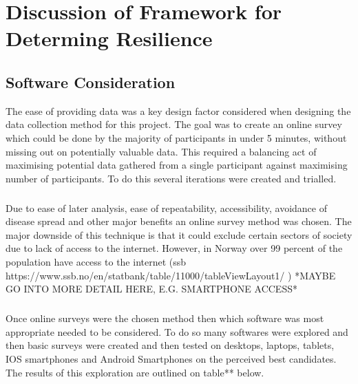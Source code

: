 \chapter{Discussion of Framework for Determing Resilience}

\section{Software Consideration}

The ease of providing data was a key design factor considered when designing the data collection method for this project. The goal was to create an online survey which could be done by the majority of participants in under 5 minutes, without missing out on potentially valuable data. This required a balancing act of maximising potential data gathered from a single participant against maximising number of participants. To do this several iterations were created and trialled.
\paragraph{}
Due to ease of later analysis, ease of repeatability, accessibility,  avoidance of disease spread and other major benefits an online survey method was chosen. The major downside of this technique is that it could exclude certain sectors of society due to lack of access to the internet. However, in Norway over 99 percent of the population have access to the internet (ssb https://www.ssb.no/en/statbank/table/11000/tableViewLayout1/ ) *MAYBE GO INTO MORE DETAIL HERE, E.G. SMARTPHONE ACCESS*
\paragraph{}
Once online surveys were the chosen method then which software was most appropriate needed to be considered. To do so many softwares were explored and then basic surveys were created and then tested on desktops, laptops, tablets, IOS smartphones and Android Smartphones on the perceived best candidates. The results of this exploration are outlined on table** below.

